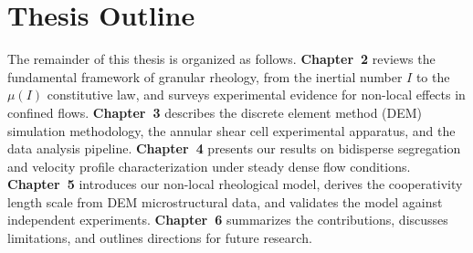 \section{Thesis Outline}

The remainder of this thesis is organized as follows. \textbf{Chapter~2} reviews the fundamental framework of granular rheology, from the inertial number $I$ to the $\mu(I)$ constitutive law, and surveys experimental evidence for non-local effects in confined flows. \textbf{Chapter~3} describes the discrete element method (DEM) simulation methodology, the annular shear cell experimental apparatus, and the data analysis pipeline. \textbf{Chapter~4} presents our results on bidisperse segregation and velocity profile characterization under steady dense flow conditions. \textbf{Chapter~5} introduces our non-local rheological model, derives the cooperativity length scale from DEM microstructural data, and validates the model against independent experiments. \textbf{Chapter~6} summarizes the contributions, discusses limitations, and outlines directions for future research.
